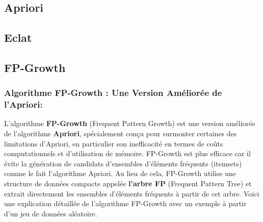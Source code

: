 \documentclass[a4paper, 12pt]{article}
\begin{document}
\subsection{Apriori}




\subsection{Eclat}

\subsection{FP-Growth}

\subsubsection{Algorithme FP-Growth : Une Version Améliorée de l'Apriori:}

L'algorithme \textbf{FP-Growth} (Frequent Pattern Growth) est une version améliorée de l'algorithme \textbf{Apriori}, spécialement conçu pour surmonter certaines des limitations d'Apriori, en particulier son inefficacité en termes de coûts computationnels et d'utilisation de mémoire. FP-Growth est plus efficace car il évite la génération de candidats d'ensembles d'éléments fréquents (itemsets) comme le fait l'algorithme Apriori. Au lieu de cela, FP-Growth utilise une structure de données compacte appelée \textbf{l'arbre FP} (Frequent Pattern Tree) et extrait directement les ensembles d'éléments fréquents à partir de cet arbre. Voici une explication détaillée de l'algorithme FP-Growth avec un exemple à partir d'un jeu de données aléatoire.
\end{document}
